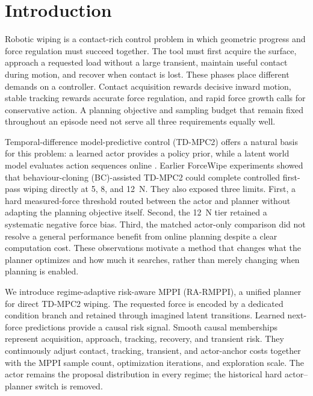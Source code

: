 \section{Introduction}
\label{sec:introduction}

Robotic wiping is a contact-rich control problem in which geometric progress
and force regulation must succeed together. The tool must first acquire the
surface, approach a requested load without a large transient, maintain useful
contact during motion, and recover when contact is lost. These phases place
different demands on a controller. Contact acquisition rewards decisive
inward motion, stable tracking rewards accurate force regulation, and rapid
force growth calls for conservative action. A planning objective and sampling
budget that remain fixed throughout an episode need not serve all three
requirements equally well.

Temporal-difference model-predictive control (TD-MPC2) offers a natural basis
for this problem: a learned actor provides a policy prior, while a latent
world model evaluates action sequences online
\cite{hansen2024tdmpc2,williams2018information}. Earlier ForceWipe experiments
showed that behaviour-cloning (BC)-assisted TD-MPC2 could complete controlled
first-pass wiping directly at 5, 8, and 12~N. They also exposed three limits.
First, a hard measured-force threshold routed between the actor and planner
without adapting the planning objective itself. Second, the 12~N tier retained
a systematic negative force bias. Third, the matched actor-only comparison
did not resolve a general performance benefit from online planning despite a
clear computation cost. These observations motivate a method that changes
what the planner optimizes and how much it searches, rather than merely
changing when planning is enabled.

We introduce regime-adaptive risk-aware MPPI (RA-RMPPI), a unified planner for
direct TD-MPC2 wiping. The requested force is encoded by a dedicated condition
branch and retained through imagined latent transitions. Learned next-force
predictions provide a causal risk signal. Smooth causal memberships represent
acquisition, approach, tracking, recovery, and transient risk. They
continuously adjust contact, tracking, transient, and actor-anchor costs
together with the MPPI sample count, optimization
iterations, and exploration scale. The actor remains the proposal
distribution in every regime; the historical hard actor--planner switch is
removed.


